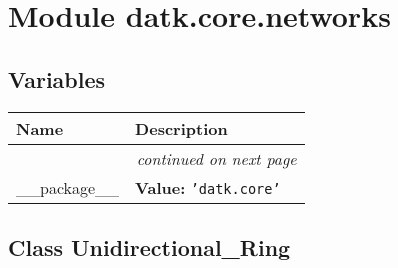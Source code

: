 %
%
%


\section{Module datk.core.networks}

    \label{datk:core:networks}


  \subsection{Variables}

    \vspace{-1cm}
\hspace{\varindent}\begin{longtable}{|p{\varnamewidth}|p{\vardescrwidth}|l}
\cline{1-2}
\cline{1-2} \centering \textbf{Name} & \centering \textbf{Description}& \\
\cline{1-2}
\endhead\cline{1-2}\multicolumn{3}{r}{\small\textit{continued on next page}}\\\endfoot\cline{1-2}
\endlastfoot\raggedright \_\-\_\-p\-a\-c\-k\-a\-g\-e\-\_\-\_\- & \raggedright \textbf{Value:} 
{\tt \texttt{'}\texttt{datk.core}\texttt{'}}&\\
\cline{1-2}
\end{longtable}



\subsection{Class Unidirectional\_Ring}

